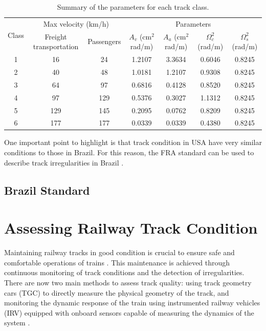 \begin{table}[H]
\begin{tabular}{c c c c c c c}
\hline
\multirow{2}{*}{Class} & \multicolumn{2}{c}{Max velocity (km/h)} & \multicolumn{4}{c}{Parameters} \\ \cline{2-7}
 & Freight transportation & Passengers & $A_v$ (cm$^2$ rad/m) & $A_a$ (cm$^2$ rad/m) & $\Omega_c^2$ (rad/m) & $\Omega_s^2$ (rad/m) \\
\hline
1 & 16  & 24  & 1.2107 & 3.3634 & 0.6046 & 0.8245 \\
2 & 40  & 48  & 1.0181 & 1.2107 & 0.9308 & 0.8245 \\
3 & 64  & 97  & 0.6816 & 0.4128 & 0.8520 & 0.8245 \\
4 & 97  & 129 & 0.5376 & 0.3027 & 1.1312 & 0.8245 \\
5 & 129 & 145 & 0.2095 & 0.0762 & 0.8209 & 0.8245 \\
6 & 177 & 177 & 0.0339 & 0.0339 & 0.4380 & 0.8245 \\
\hline
\end{tabular}
\caption{Summary of the parameters for each track class. \cite{PIRES2021107806}}
\label{tab:FRA-PSD-parameters}
\end{table}

One important point to highlight is that track condition in USA have very similar conditions to those in Brazil. For this reason, the FRA standard can be used to describe track irregularities in Brazil \cite{PIRES2021107806}.

\subsection{Brazil Standard} \label{sec-Brazil-Standard}

\section{Assessing Railway Track Condition} \label{sec-assessing-railway-track}

Maintaining railway tracks in good condition is crucial to ensure safe and comfortable operations of trains \cite{Tsunashima-2019,GHIASI2025109516}. This maintenance is achieved through continuous monitoring of track conditions and the detection of irregularities. There are now two main methods to assess track quality: using track geometry cars (TGC) to directly measure the physical geometry of the track, and monitoring the dynamic response of the train using instrumented railway vehicles (IRV) equipped with onboard sensors capable of measuring the dynamics of the system \cite{PIRES2024107191}.

